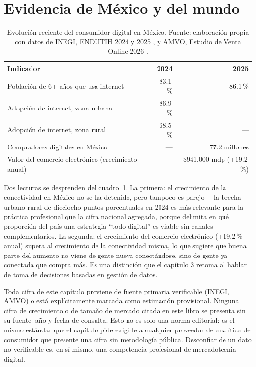 \section{Evidencia de México y del mundo}
\label{sec:cap01-evidencia}

\begin{table}[htbp]
\centering
\begin{tabular}{@{}lrr@{}}
\toprule
Indicador & 2024 & 2025 \\
\midrule
Población de 6+ años que usa internet & 83.1\,\% & 86.1\,\% \\
Adopción de internet, zona urbana & 86.9\,\% & — \\
Adopción de internet, zona rural & 68.5\,\% & — \\
Compradores digitales en México & — & 77.2 millones \\
Valor del comercio electrónico (crecimiento anual) & — & \$941{,}000 mdp (+19.2\,\%) \\
\bottomrule
\end{tabular}
\caption{Evolución reciente del consumidor digital en México. Fuente:
elaboración propia con datos de INEGI, ENDUTIH 2024 y 2025
\parencite{inegi2025endutih,inegi2026endutih}, y AMVO, Estudio de Venta
Online 2026 \parencite{amvo2026}.}
\label{tab:cap01-evidencia}
\end{table}

Dos lecturas se desprenden del cuadro~\ref{tab:cap01-evidencia}. La primera:
el crecimiento de la conectividad en México no se ha detenido, pero tampoco
es parejo —la brecha urbano-rural de dieciocho puntos porcentuales en 2024 es
más relevante para la práctica profesional que la cifra nacional agregada,
porque delimita en qué proporción del país una estrategia \enquote{todo digital} es
viable sin canales complementarios. La segunda: el crecimiento del comercio
electrónico (+19.2\,\% anual) supera al crecimiento de la conectividad
misma, lo que sugiere que buena parte del aumento no viene de gente nueva
conectándose, sino de gente ya conectada que compra más. Es una distinción
que el capítulo 3 retoma al hablar de toma de decisiones basadas en gestión
de datos.

\begin{cajaEtica}
Toda cifra de este capítulo proviene de fuente primaria verificable (INEGI,
AMVO) o está explícitamente marcada como estimación provisional. Ninguna
cifra de crecimiento o de tamaño de mercado citada en este libro se presenta
sin su fuente, año y fecha de consulta. Esto no es solo una norma editorial:
es el mismo estándar que el capítulo pide exigirle a cualquier proveedor de
analítica de consumidor que presente una cifra sin metodología pública.
Desconfiar de un dato no verificable es, en sí mismo, una competencia
profesional de mercadotecnia digital.
\end{cajaEtica}

